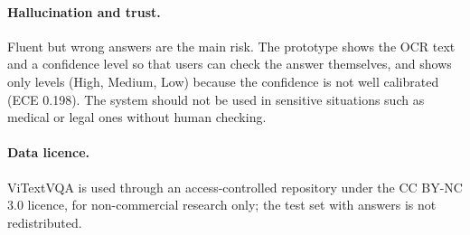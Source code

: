 \paragraph{Hallucination and trust.} Fluent but wrong answers are the main risk. The
prototype shows the OCR text and a confidence level so that users can check the answer
themselves, and shows only levels (High, Medium, Low) because the confidence is not well
calibrated (ECE 0.198). The system should not be used in sensitive situations such as
medical or legal ones without human checking.

\paragraph{Data licence.} ViTextVQA is used through an access-controlled repository under the
CC BY-NC 3.0 licence, for non-commercial research only; the test set with answers is not
redistributed.
